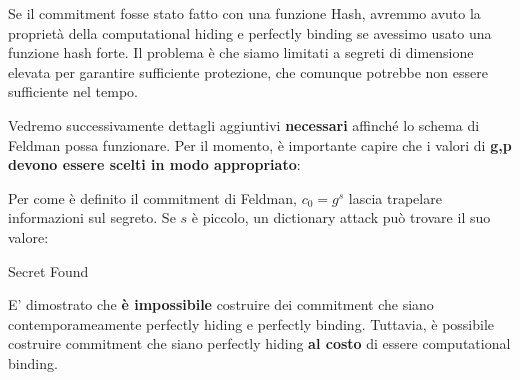 \begin{note}
Se il commitment fosse stato fatto con una funzione Hash, avremmo avuto la proprietà della computational hiding e perfectly binding se avessimo usato una funzione hash forte. Il problema è che siamo limitati a segreti di dimensione elevata per garantire sufficiente protezione, che comunque potrebbe non essere sufficiente nel tempo.
\end{note}
Vedremo successivamente dettagli aggiuntivi \textbf{necessari} affinché lo schema di Feldman possa funzionare. Per il momento, è importante capire che i valori di \textbf{g,p} \textbf{devono essere scelti in modo appropriato}:\\
\begin{remark}
Per come è definito il commitment di Feldman, $c_0=g^s$ lascia trapelare informazioni sul segreto. Se $s$ è piccolo, un dictionary attack può trovare il suo valore:
\begin{algorithmic}[1]
\State Secret Found
\EndIf
\EndFor
\end{algorithmic}
\end{remark}
\begin{note}
E' dimostrato che \textbf{è impossibile} costruire dei commitment che siano contemporameamente perfectly hiding e perfectly binding. Tuttavia, è possibile costruire commitment che siano perfectly hiding \textbf{al costo} di essere computational binding.
\end{note}\pagebreak
